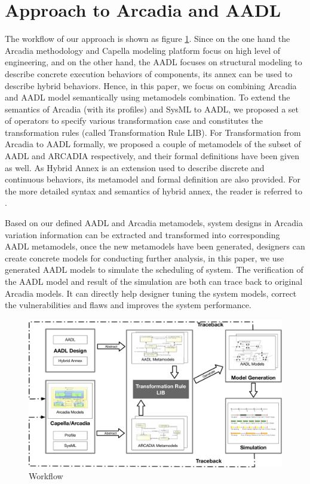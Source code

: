 \section{Approach to Arcadia and AADL}\label{sec:app}
The workflow of our approach is shown as figure \ref{fig:wf}. Since on the one hand the Arcadia methodology and Capella modeling platform focus on high level of engineering, and on the other hand, the AADL focuses on structural modeling to describe concrete execution behaviors of components, its annex can be used to describe hybrid behaviors. Hence, in this paper, we focus on combining Arcadia and AADL model semantically using metamodels combination. To extend the semantics of Arcadia (with its profiles) and SysML to AADL, we proposed a set of operators to specify various transformation case and constitutes the transformation rules (called Transformation Rule LIB). For Transformation from Arcadia to AADL formally, we proposed a couple of metamodels of the subset of AADL and ARCADIA respectively, and their formal definitions have been given as well. As Hybrid Annex is an extension used to describe discrete and continuous behaviors, its metamodel and formal definition are also provided. For the more detailed syntax and semantics of hybrid annex, the reader is referred to \cite{Ahmad:2014:HAA:2692956.2663178}. 

Based on our defined AADL and Arcadia metamodels, system designs in Arcadia variation information can be extracted and transformed into corresponding AADL metamodels, once the new metamodels have been generated, designers can create concrete models for conducting further analysis, in this paper, we use generated AADL models to simulate the scheduling of system. The verification of the AADL model and result of the simulation are both can trace back to original Arcadia models. It can directly help designer tuning the system models, correct the vulnerabilities and flaws and improves the system performance.  


\begin{figure}[h]
\centering
\includegraphics[width=.85\textwidth]{img/method}
\caption{Workflow}
\label{fig:wf}
\end{figure}

